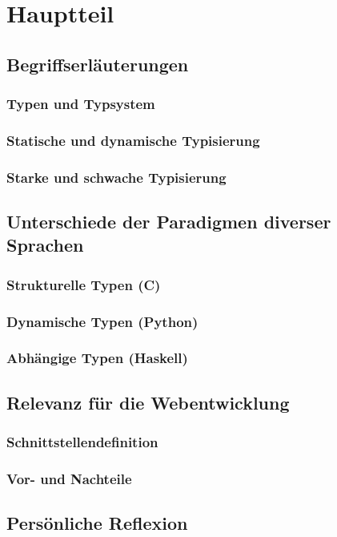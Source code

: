 \section{Hauptteil}

\subsection{Begriffserläuterungen}

\subsubsection{Typen und Typsystem}
\subsubsection{Statische und dynamische Typisierung}
\subsubsection{Starke und schwache Typisierung}

\subsection{Unterschiede der Paradigmen diverser Sprachen}

\subsubsection{Strukturelle Typen (C)}
\subsubsection{Dynamische Typen (Python)} %
\subsubsection{Abhängige Typen (Haskell)}

\subsection{Relevanz für die Webentwicklung}

\subsubsection{Schnittstellendefinition}
\subsubsection{Vor- und Nachteile}

\subsection{Persönliche Reflexion}
